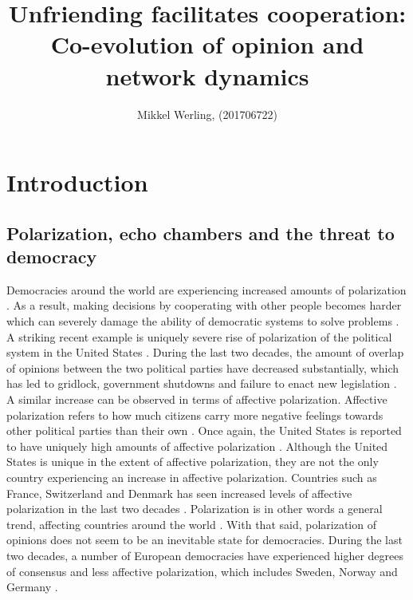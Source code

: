 \documentclass{article}
\title{Unfriending facilitates cooperation: \\Co-evolution of opinion and network dynamics}
\author{Mikkel Werling, (201706722)}
\date{}
\begin{document}
\maketitle
\tableofcontents
\newpage
\section{Introduction}

\subsection{Polarization, echo chambers and the threat to democracy}

Democracies around the world are experiencing increased amounts of polarization \cite{boxell_cross-country_2020,mccoy_polarization_2018, somer_deja_2018}. As a result, making decisions by cooperating with other people becomes harder which can severely damage the ability of democratic systems to solve problems \cite{andris_rise_2015,levin_dynamics_2021,mccoy_polarization_2018}. A striking recent example is uniquely severe rise of polarization of the political system in the United States \cite{dimock_america_2020}. During the last two decades, the amount of overlap of opinions between the two political parties have decreased substantially, which has led to gridlock, government shutdowns and failure to enact new legislation \cite{andris_rise_2015, pew_research_center_political_2014-1}. A similar increase can be observed in terms of affective polarization. Affective polarization refers to how much citizens carry more negative feelings towards other political parties than their own \cite{boxell_cross-country_2020, iyengar_origins_2019}. Once again, the United States is reported to have uniquely high amounts of affective polarization \cite{boxell_cross-country_2020}. Although the United States is unique in the extent of affective polarization, they are not the only country experiencing an increase in affective polarization. Countries such as France, Switzerland and Denmark has seen increased levels of affective polarization in the last two decades \cite{boxell_cross-country_2020}. Polarization is in other words a general trend, affecting countries around the world \cite{mccoy_polarization_2018, somer_deja_2018, wilson_polarization_2020}. With that said, polarization of opinions does not seem to be an inevitable state for democracies. During the last two decades, a number of European democracies have experienced higher degrees of consensus and less affective polarization, which includes Sweden, Norway and Germany \cite{boxell_cross-country_2020}. 
\end{document}
